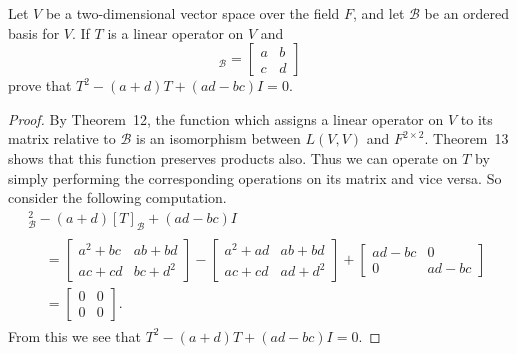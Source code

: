  Let $V$ be a two-dimensional vector space over the field
$F$, and let $\mathcal{B}$ be an ordered basis for $V$. If $T$ is a
linear operator on $V$ and
\begin{equation*}
  [T]_{\mathcal{B}} =
  \begin{bmatrix}
    a & b \\
    c & d
  \end{bmatrix}
\end{equation*}
prove that $T^2 - (a + d)T + (ad - bc)I = 0$.
\begin{proof}
  By Theorem~12, the function which assigns a linear operator on $V$
  to its matrix relative to $\mathcal{B}$ is an isomorphism between
  $L(V, V)$ and $F^{2\times 2}$. Theorem~13 shows that this function
  preserves products also. Thus we can operate on $T$ by simply
  performing the corresponding operations on its matrix and vice
  versa. So consider the following computation.
  \begin{multline*}
    [T]_{\mathcal{B}}^2 - (a + d)[T]_{\mathcal{B}} + (ad - bc)I \\
    \begin{aligned}
      &=
      \begin{bmatrix}
        a^2 + bc & ab + bd \\
        ac + cd & bc + d^2
      \end{bmatrix}
      -
      \begin{bmatrix}
        a^2 + ad & ab + bd \\
        ac + cd & ad + d^2
      \end{bmatrix}
      +
      \begin{bmatrix}
        ad - bc & 0 \\
        0 & ad - bc
      \end{bmatrix} \\
      &=
      \begin{bmatrix}
        0 & 0 \\
        0 & 0
      \end{bmatrix}.
    \end{aligned}
  \end{multline*}
  From this we see that $T^2 - (a + d)T + (ad - bc)I = 0$.
\end{proof}

